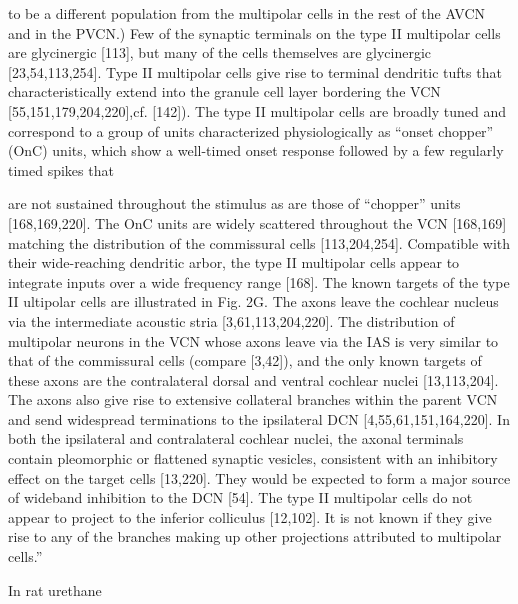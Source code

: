 \documentclass[10pt,a4paper]{article}
\begin{document}
to be a different population from the multipolar cells in the rest of the AVCN
and in the PVCN.) Few of the synaptic terminals on the type II multipolar cells
are glycinergic [113], but many of the cells themselves are glycinergic
[23,54,113,254]. Type II multipolar cells give rise to terminal dendritic tufts
that characteristically extend into the granule cell layer bordering the VCN
[55,151,179,204,220],cf.  [142]). The type II multipolar cells are broadly tuned
and correspond to a group of units characterized physiologically as
{\textquotedblleft}onset chopper{\textquotedblright} (OnC) units, which show a
well-timed onset response followed by a few regularly timed spikes that

are not sustained throughout the stimulus as are those of
{\textquotedblleft}chopper{\textquotedblright} units [168,169,220]. The OnC
units are widely scattered throughout the VCN [168,169] matching the
distribution of the commissural cells [113,204,254]. Compatible with their
wide-reaching dendritic arbor, the type II multipolar cells appear to integrate
inputs over a wide frequency range [168]. The known targets of the type II
ultipolar cells are illustrated in Fig. 2G. The axons leave the cochlear nucleus
via the intermediate acoustic stria [3,61,113,204,220]. The distribution of
multipolar neurons in the VCN whose axons leave via the IAS is very similar to
that of the commissural cells (compare [3,42]), and the only known targets of
these axons are the contralateral dorsal and ventral cochlear nuclei
[13,113,204]. The axons also give rise to extensive collateral branches within
the parent VCN and send widespread terminations to the ipsilateral DCN
[4,55,61,151,164,220]. In both the ipsilateral and contralateral cochlear
nuclei, the axonal terminals contain pleomorphic or flattened synaptic vesicles,
consistent with an inhibitory effect on the target cells [13,220]. They would be
expected to form a major source of wideband inhibition to the DCN [54]. The type
II multipolar cells do not appear to project to the inferior colliculus
[12,102]. It is not known if they give rise to any of the branches making up
other projections attributed to multipolar cells.{\textquotedblright}

\citep{BrewForsythe:1995}

In rat urethane \citep{PaoliniClark:1999}
\end{document}
